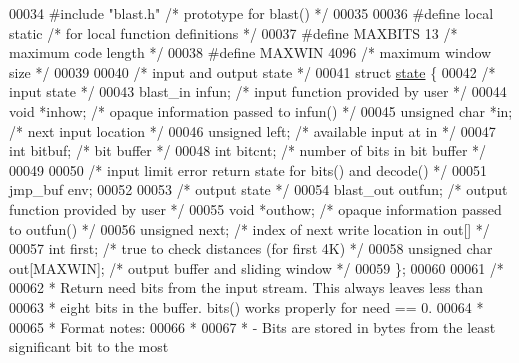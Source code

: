 \begin{DoxyCode}
00034 \textcolor{preprocessor}{#include "blast.h"}              \textcolor{comment}{/* prototype for blast() */}
00035 
00036 \textcolor{preprocessor}{#define local static            }\textcolor{comment}{/* for local function definitions */}\textcolor{preprocessor}{}
00037 \textcolor{preprocessor}{#define MAXBITS 13              }\textcolor{comment}{/* maximum code length */}\textcolor{preprocessor}{}
00038 \textcolor{preprocessor}{#define MAXWIN 4096             }\textcolor{comment}{/* maximum window size */}\textcolor{preprocessor}{}
00039 
00040 \textcolor{comment}{/* input and output state */}
00041 \textcolor{keyword}{struct }\hyperlink{structstate}{state} \{
00042     \textcolor{comment}{/* input state */}
00043     blast\_in infun;             \textcolor{comment}{/* input function provided by user */}
00044     \textcolor{keywordtype}{void} *inhow;                \textcolor{comment}{/* opaque information passed to infun() */}
00045     \textcolor{keywordtype}{unsigned} \textcolor{keywordtype}{char} *in;          \textcolor{comment}{/* next input location */}
00046     \textcolor{keywordtype}{unsigned} left;              \textcolor{comment}{/* available input at in */}
00047     \textcolor{keywordtype}{int} bitbuf;                 \textcolor{comment}{/* bit buffer */}
00048     \textcolor{keywordtype}{int} bitcnt;                 \textcolor{comment}{/* number of bits in bit buffer */}
00049 
00050     \textcolor{comment}{/* input limit error return state for bits() and decode() */}
00051     jmp\_buf env;
00052 
00053     \textcolor{comment}{/* output state */}
00054     blast\_out outfun;           \textcolor{comment}{/* output function provided by user */}
00055     \textcolor{keywordtype}{void} *outhow;               \textcolor{comment}{/* opaque information passed to outfun() */}
00056     \textcolor{keywordtype}{unsigned} next;              \textcolor{comment}{/* index of next write location in out[] */}
00057     \textcolor{keywordtype}{int} first;                  \textcolor{comment}{/* true to check distances (for first 4K) */}
00058     \textcolor{keywordtype}{unsigned} \textcolor{keywordtype}{char} out[MAXWIN];  \textcolor{comment}{/* output buffer and sliding window */}
00059 \};
00060 
00061 \textcolor{comment}{/*}
00062 \textcolor{comment}{ * Return need bits from the input stream.  This always leaves less than}
00063 \textcolor{comment}{ * eight bits in the buffer.  bits() works properly for need == 0.}
00064 \textcolor{comment}{ *}
00065 \textcolor{comment}{ * Format notes:}
00066 \textcolor{comment}{ *}
00067 \textcolor{comment}{ * - Bits are stored in bytes from the least significant bit to the most}

\end{DoxyCode}
